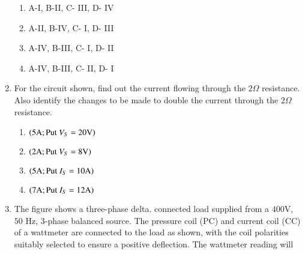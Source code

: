 \documentclass[journal]{IEEEtran}
\begin{document}
\begin{enumerate}[start=37]
\begin{figure}[!ht]
    \label{fig:my_label}
    \end{figure}

    \begin{multicols}{2}
    \begin{enumerate}
        \item A-I, B-II, C- III, D- IV
        \item A-II, B-IV, C- I, D- III
        \item A-IV, B-III, C- I, D- II
        \item A-IV, B-III, C- II, D- I
    \end{enumerate}
        
    \end{multicols}

    \item For the circuit shown, find out the current flowing through the $2\Omega$ resistance. Also identify the changes to be made to double the current through the $2\Omega$ resistance.
    \begin{figure}[!ht]
    \centering

    \label{fig:my_label}
    \end{figure}

    \begin{multicols}{2}
    \begin{enumerate}
        \item $\left(5\text{A} ; \text{Put } V_S = 20\text{V}\right)$
        \item $\left(2\text{A} ; \text{Put } V_S = 8\text{V}\right)$
        \item $\left(5\text{A} ; \text{Put } I_S = 10\text{A}\right)$ 
        \item $\left(7\text{A} ; \text{Put } I_S = 12\text{A}\right)$
    \end{enumerate}
    \end{multicols}

    \item The figure shows a three-phase delta. connected load supplied from a $400$V, $50$ Hz, $3$-phase balanced source. The pressure coil (PC) and current coil (CC) of a wattmeter are connected to the load as shown, with the coil polarities suitably selected to ensure a positive deflection. The wattmeter reading will


\end{enumerate}
\end{document}
